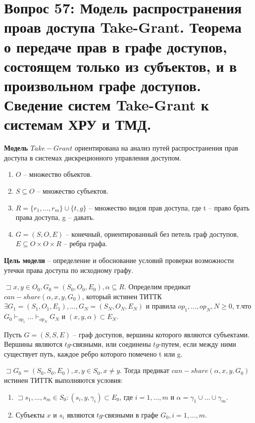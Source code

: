 \section{Вопрос 57: Модель распространения проав доступа Take-Grant. Теорема о передаче прав в графе доступов, состоящем только из субъектов, и в произвольном графе доступов. Сведение систем Take-Grant к системам ХРУ и ТМД.}

\textbf{Модель $Take-Grant$} ориентирована на анализ путей распространения прав доступа в системах дискреционного управления доступом.

\begin{defs}
	\begin{enumerate}
		\item $ O $ -- множество объектов.
		\item $S \subseteq O$ -- множество субъектов.
		\item $ R = \{ r_1, \ldots, r_m \} \cup \{ t, g \} $ -- множество видов прав доступа, где t -- право брать права доступа, g -- давать.
		\item $ G = (S, O, E) $ -- конечный, ориентированный без петель граф доступов, $E \subseteq O \times O \times R $ -- ребра графа.
	\end{enumerate}
\end{defs}

\textbf{Цель модели} -- определение и обоснование условий проверки возможности утечки права доступа по исходному графу.

\begin{defs}
	$ \sqsupset x,y \in O_0, G_0 = (S_0, O_0, E_0), \alpha   \subseteq R$. Определим предикат
	$can-share(\alpha, x, y, G_0)$, который истинен ТИТТК $ \exists G_1 = (S_1, O_1, E_1), \ldots,
	G_N = (S_N, O_N, E_N)$ и правила $op_1, \ldots, op_N, N \geqslant 0$, т.что
	$G_0 \vdash_{op_1} \ldots \vdash_{op_N} G_N $ и $(x, y, \alpha) \subset E_N$.
\end{defs}

\begin{defs}[$tg$-связность]
	Пусть $G = (S, S, E)$ -- граф доступов, вершины которого являются субъектами. Вершины являются $tg$-связными, или
	соединены $tg$-путем, если между ними существует путь, каждое ребро которого помечено t или g.
\end{defs}

\begin{proofs}
	$\sqsupset  G_0 = (S_0, S_0, E_0), x,y \in S_0, x \neq y$. Тогда предикат $can-share(\alpha, x, y, G_0)$
	истинен ТИТТК выполняются условия:
	\begin{enumerate}
		\item $ \sqsupset s_1, \ldots, s_m \in S_0 : (s_i, y, \gamma_i) \subset E_0 $, где
		$ i = 1, \ldots, m $ и $ \alpha = \gamma_1 \cup \ldots \cup \gamma_m $.
		\item Субъекты $ x $ и $ s_i $ являются $tg$-связными в графе $G_0, i = 1, \ldots, m $.
	\end{enumerate}
\end{proofs}

